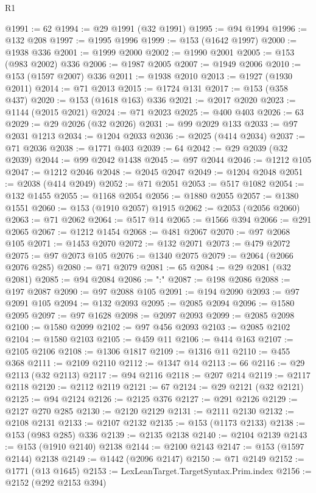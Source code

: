\begin{lexlean}{R1}
\begin{coremodule}
{{{{{{{{{{{{{{{{{{{{{{{{{{{{{{{{{{{{{{{{{{{{{{{{{{{{{{{{{{{{{{{{{{{{{{{{{{{{{{{{{{{{{{{{{{{{{{{{{{{{{{{{{{{{{{{{{{{{{{{{{{{{{{{{{{{{{{{{{{{{{{{{{{{{{{{{{{{{{{{{{{{{{{{{{{{{{{{{{{{{{{{{{{@1991 := 62
@1994 := @29 @1991 (@32 @1991)
@1995 := @94 @1994
@1996 := @132 @208
@1997 := @1995 @1996
@1999 := @153 (@1642 @1997)
@2000 := @1938 @336
@2001 := @1999 @2000
@2002 := @1990 @2001
@2005 := @153 (@983 @2002) @336
@2006 := @1987 @2005
@2007 := @1949 @2006
@2010 := @153 (@1597 @2007) @336
@2011 := @1938 @2010
@2013 := @1927 (@1930 @2011)
@2014 := @71 @2013
@2015 := @1724 @131
@2017 := @153 (@358 @437)
@2020 := @153 (@1618 @163) @336
@2021 := @2017 @2020
@2023 := @1144 (@2015 @2021)
@2024 := @71 @2023
@2025 := @400 @403
@2026 := 63
@2029 := @29 @2026 (@32 @2026)
@2031 := @99 @2029 @133
@2033 := @97 @2031 @1213
@2034 := @1204 @2033
@2036 := @2025 (@414 @2034)
@2037 := @71 @2036
@2038 := @1771 @403
@2039 := 64
@2042 := @29 @2039 (@32 @2039)
@2044 := @99 @2042 @1438
@2045 := @97 @2044
@2046 := @1212 @105
@2047 := @1212 @2046
@2048 := @2045 @2047
@2049 := @1204 @2048
@2051 := @2038 (@414 @2049)
@2052 := @71 @2051
@2053 := @517 @1082
@2054 := @132 @1455
@2055 := @1168 @2054
@2056 := @1880 @2055
@2057 := @1380 @1551
@2060 := @153 (@1910 @2057) @1915
@2062 := @2053 (@2056 @2060)
@2063 := @71 @2062
@2064 := @517 @14
@2065 := @1566 @394
@2066 := @291 @2065
@2067 := @1212 @1454
@2068 := @481 @2067
@2070 := @97 @2068 @105
@2071 := @1453 @2070
@2072 := @132 @2071
@2073 := @479 @2072
@2075 := @97 @2073 @105
@2076 := @1340 @2075
@2079 := @2064 (@2066 @2076 @285)
@2080 := @71 @2079
@2081 := 65
@2084 := @29 @2081 (@32 @2081)
@2085 := @94 @2084
@2086 := ":"
@2087 := @198 @2086
@2088 := @197 @2087
@2090 := @97 @2088 @105
@2091 := @194 @2090
@2093 := @97 @2091 @105
@2094 := @132 @2093
@2095 := @2085 @2094
@2096 := @1580 @2095
@2097 := @97 @1628
@2098 := @2097 @2093
@2099 := @2085 @2098
@2100 := @1580 @2099
@2102 := @97 @456 @2093
@2103 := @2085 @2102
@2104 := @1580 @2103
@2105 := @459 @11
@2106 := @414 @163
@2107 := @2105 @2106
@2108 := @1306 @1817
@2109 := @1316 @11
@2110 := @455 @368
@2111 := @2109 @2110
@2112 := @1347 @14
@2113 := 66
@2116 := @29 @2113 (@32 @2113)
@2117 := @94 @2116
@2118 := @207 @214
@2119 := @2117 @2118
@2120 := @2112 @2119
@2121 := 67
@2124 := @29 @2121 (@32 @2121)
@2125 := @94 @2124
@2126 := @2125 @376
@2127 := @291 @2126
@2129 := @2127 @270 @285
@2130 := @2120 @2129
@2131 := @2111 @2130
@2132 := @2108 @2131
@2133 := @2107 @2132
@2135 := @153 (@1173 @2133)
@2138 := @153 (@983 @285) @336
@2139 := @2135 @2138
@2140 := @2104 @2139
@2143 := @153 (@1910 @2140) @2138
@2144 := @2100 @2143
@2147 := @153 (@1597 @2144) @2138
@2149 := @1442 (@2096 @2147)
@2150 := @71 @2149
@2152 := @1771 (@13 @1645)
@2153 := LexLeanTarget.TargetSyntax.Prim.index
@2156 := @2152 (@292 @2153 @394)
}}}}}}}}}}}}}}}}}}}}}}}}}}}}}}}}}}}}}}}}}}}}}}}}}}}}}}}}}}}}}}}}}}}}}}}}}}}}}}}}}}}}}}}}}}}}}}}}}}}}}}}}}}}}}}}}}}}}}}}}}}}}}}}}}}}}}}}}}}}}}}}}}}}}}}}}}}}}}}}}}}}}}}}}}}}}}}}}}}}}}}}}}}
\end{coremodule}
\end{lexlean}
